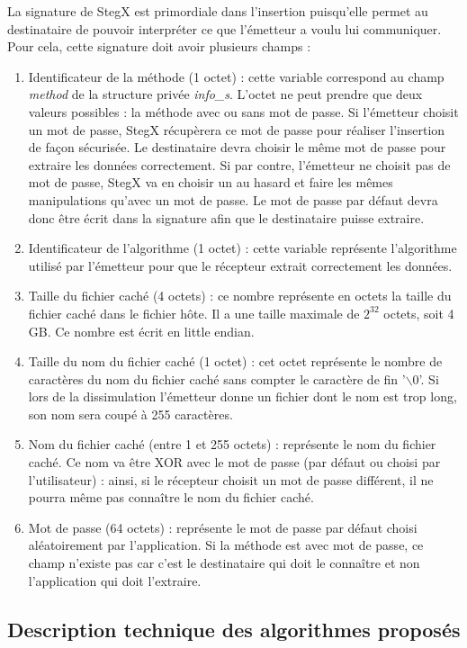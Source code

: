 \documentclass[11pt]{article}
\begin{document}
La signature de StegX est primordiale dans l'insertion puisqu'elle permet au 
destinataire de pouvoir interpréter ce que l'émetteur a voulu lui communiquer. 
Pour cela, cette signature doit avoir plusieurs champs : 
\begin {enumerate}
\item Identificateur de la méthode (1 octet) : cette variable correspond au 
champ \textit{method} de la structure privée \textit{info\_s}. L'octet ne 
peut prendre que deux valeurs possibles : la méthode avec ou sans mot de 
passe. Si l'émetteur choisit un mot de passe, StegX récupèrera ce mot de 
passe pour réaliser l'insertion de façon sécurisée. Le destinataire devra 
choisir le même mot de passe pour extraire les données correctement. 
Si par contre, l'émetteur ne choisit pas de mot de passe, StegX va en choisir 
un au hasard et faire les mêmes manipulations qu'avec un mot de passe. 
Le mot de passe par défaut devra donc être écrit dans la signature afin que 
le destinataire puisse extraire. 
\item Identificateur de l'algorithme (1 octet) : cette variable représente 
l'algorithme utilisé par l'émetteur pour que le récepteur extrait correctement 
les données. 
\item Taille du fichier caché (4 octets) : ce nombre représente en octets 
la taille du fichier caché dans le fichier hôte. Il a une taille maximale 
de $2^{32}$ octets, soit 4 GB. Ce nombre est écrit en little endian. 
\item Taille du nom du fichier caché (1 octet) : cet octet représente le 
nombre de caractères du nom du fichier caché sans compter le caractère de 
fin '$\backslash$0'. Si lors de la dissimulation l'émetteur donne un fichier 
dont le nom est trop long, son nom sera coupé à 255 caractères. 
\item Nom du fichier caché (entre 1 et 255 octets) : représente le nom du 
fichier caché. Ce nom va être XOR avec le mot de passe (par défaut ou choisi
par l'utilisateur) : ainsi, si le récepteur choisit un mot de passe différent, 
il ne pourra même pas connaître le nom du fichier caché. 
\item Mot de passe (64 octets) : représente le mot de passe par défaut choisi 
aléatoirement par l'application. Si la méthode est avec mot de passe, 
ce champ n'existe pas car c'est le destinataire qui doit le connaître et 
non l'application qui doit l'extraire. 
\end{enumerate}

\subsection{Description technique des algorithmes proposés}
\end{document}
